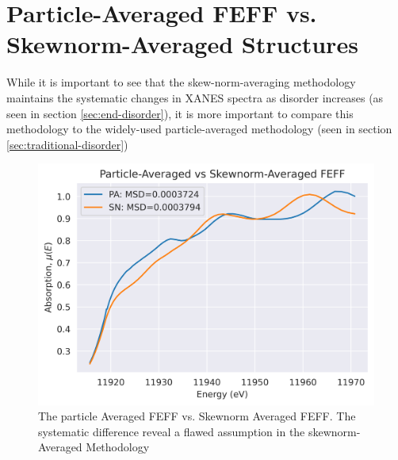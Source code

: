 \section{Particle-Averaged FEFF vs. Skewnorm-Averaged Structures} \label{sec:pa-feff-vs-gaussian-feff}

While it is important to see that the skew-norm-averaging methodology maintains the systematic changes in XANES spectra as disorder increases (as seen in section \ref{sec:end-disorder}), it is more important to compare this methodology to the widely-used particle-averaged methodology (seen in section \ref{sec:traditional-disorder})




\begin{figure}[!h]
	\centering
	\label{fig:pa-vs-sknm-feff}
	\includegraphics[width=.75\linewidth]{Chapters/Figures/PA-vs-skewnorm-newvals.png}
	\caption[Particle-Averaged vs. Skewnorm-Averaged FEFF Low-Disorder]{The particle Averaged FEFF vs. Skewnorm Averaged FEFF. The systematic difference reveal a flawed assumption in the skewnorm-Averaged Methodology}
\end{figure}

